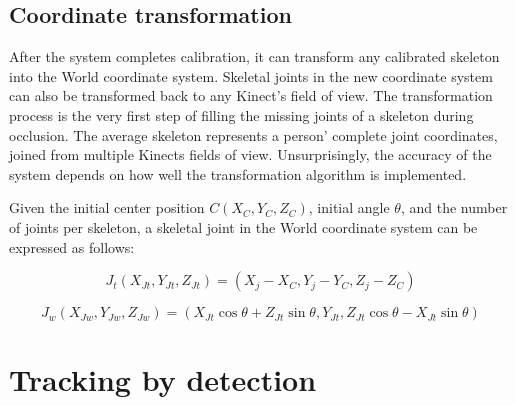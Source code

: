 \subsection{Coordinate transformation}

After the system completes calibration, it can transform any calibrated skeleton into the World coordinate system. Skeletal joints in the new coordinate system can also be transformed back to any Kinect's field of view. The transformation process is the very first step of filling the missing joints of a skeleton during occlusion. The average skeleton represents a person' complete joint coordinates, joined from multiple Kinects fields of view. Unsurprisingly, the accuracy of the system depends on how well the transformation algorithm is implemented.

Given the initial center position $C(X_C, Y_C, Z_C)$, initial angle $\theta$, and the number of joints per skeleton, a skeletal joint in the World coordinate system can be expressed as follows:

\begin{equation}
\label{eq:joint_translated}
J_t (X_{Jt}, Y_{Jt}, Z_{Jt}) = (X_j - X_C, Y_j - Y_C, Z_j - Z_C)
\end{equation}

\begin{equation}
\label{eq:joint_worldview}
J_w (X_{Jw}, Y_{Jw}, Z_{Jw}) = (X_{Jt}\cos\theta + Z_{Jt}\sin\theta, Y_{Jt}, Z_{Jt}\cos\theta - X_{Jt}\sin\theta)
\end{equation}




\section{Tracking by detection}
\label{sec:current_approach_tracking_by_detection}


